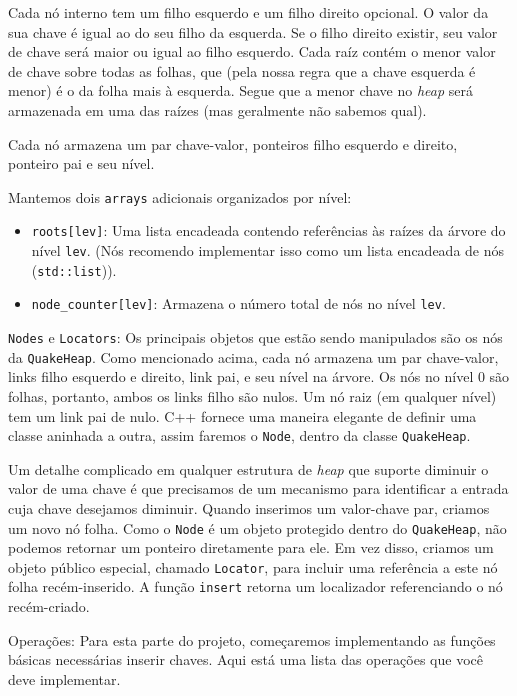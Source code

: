 \documentclass{article}
\begin{document}
Cada nó interno tem um filho esquerdo e um filho direito opcional. O valor da sua chave é igual ao do seu filho da esquerda. Se o filho direito existir, seu valor de chave será maior ou igual ao filho esquerdo. Cada raíz contém o menor valor de chave sobre todas as folhas, que (pela nossa regra que a chave esquerda é menor) é o da folha mais à esquerda. Segue que a menor chave no \textit{heap} será armazenada em uma das raízes (mas geralmente não sabemos qual).

Cada nó armazena um par chave-valor, ponteiros filho esquerdo e direito, ponteiro pai e seu nível. 

Mantemos dois \texttt{arrays} adicionais organizados por nível:
\begin{itemize}
    \item \texttt{roots[lev]}: Uma lista encadeada contendo referências às raízes da árvore do nível \texttt{lev}. (Nós recomendo implementar isso como um lista encadeada de nós (\texttt{std::list})).
    \item \texttt{node\_counter[lev]}: Armazena o número total de nós no nível \texttt{lev}.
\end{itemize}

\texttt{Nodes} e \texttt{Locators}: Os principais objetos que estão sendo manipulados são os nós da \texttt{QuakeHeap}. Como mencionado acima, cada nó armazena um par chave-valor, links filho esquerdo e direito, link pai,
e seu nível na árvore. Os nós no nível 0 são folhas, portanto, ambos os links filho são nulos. Um nó raiz (em qualquer nível) tem um link pai de nulo. C++ fornece uma maneira elegante de definir uma classe aninhada a outra, assim faremos o \texttt{Node}, dentro da classe \texttt{QuakeHeap}.

Um detalhe complicado em qualquer estrutura de \textit{heap} que suporte diminuir o valor de uma chave é que precisamos de um mecanismo para identificar a entrada cuja chave desejamos diminuir. Quando inserimos um valor-chave
par, criamos um novo nó folha. Como o \texttt{Node} é um objeto protegido dentro do \texttt{QuakeHeap}, não podemos retornar um ponteiro diretamente para ele. Em vez disso, criamos um objeto público especial, chamado \texttt{Locator},
para incluir uma referência a este nó folha recém-inserido. A função \texttt{insert} retorna um localizador referenciando o nó recém-criado. 

Operações: Para esta parte do projeto, começaremos implementando as funções básicas necessárias inserir chaves. Aqui está uma lista das operações que você deve implementar.
\end{document}
